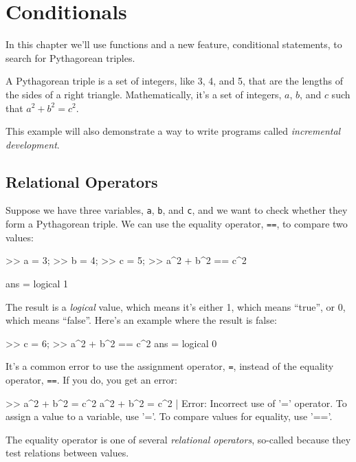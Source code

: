\chapter{Conditionals}

In this chapter we'll use functions and a new feature, conditional statements, to search for Pythagorean triples.

A Pythagorean triple is a set of integers, like 3, 4, and 5,
that are the lengths of the sides of a right triangle.  Mathematically, it's a set of integers, $a$, $b$, and $c$ such that $a^2 + b^2 = c^2$.

This example will also demonstrate a way to write programs called {\em incremental development}.


\section{Relational Operators}

Suppose we have three variables, {\tt a}, {\tt b}, and {\tt c}, and we want to check whether they form a Pythagorean triple.  We can use the equality operator, {\tt ==}, to compare two values:

\begin{code}
>> a = 3;
>> b = 4;
>> c = 5;
>> a^2 + b^2 == c^2

ans = logical 1
\end{code}

The result is a {\em logical} value, which means it's either 1, which means ``true'', or 0, which means ``false''.  Here's an example where the result is false:

\begin{code}
>> c = 6;
>> a^2 + b^2 == c^2
ans = logical 0
\end{code}

It's a common error to use the assignment operator, {\tt =}, instead of the equality operator, {\tt ==}.  If you do, you get an error:

\begin{code}
>> a^2 + b^2 = c^2
 a^2 + b^2 = c^2
           |
Error: Incorrect use of '=' operator. 
To assign a value to a variable, use '='. 
To compare values for equality, use '=='.
\end{code}

The equality operator is one of several {\em relational operators}, so-called because they test relations between values.

